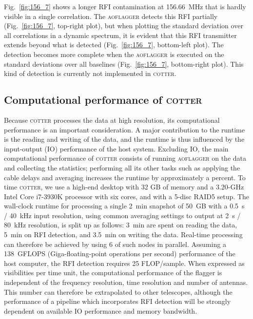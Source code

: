 \documentclass{pasa}
\begin{document}
Fig.~\ref{fig:156_7} shows a longer RFI contamination at 156.66~MHz that is hardly visible in a single correlation. The \textsc{aoflagger} detects this RFI partially (Fig.~\ref{fig:156_7}, top-right plot), but when plotting the standard deviation over all correlations in a dynamic spectrum, it is evident that this RFI transmitter extends beyond what is detected (Fig.~\ref{fig:156_7}, bottom-left plot). The detection becomes more complete when the \textsc{aoflagger} is executed on the standard deviations over all baselines (Fig.~\ref{fig:156_7}, bottom-right plot). This kind of detection is currently not implemented in \textsc{cotter}.

\subsection{Computational performance of \textsc{cotter}}
Because \textsc{cotter} processes the data at high resolution, its computational performance is an important consideration. A major contribution to the runtime is the reading and writing of the data, and the runtime is thus influenced by the input-output (IO) performance of the host system. Excluding IO, the main computational performance of \textsc{cotter} consists of running \textsc{aoflagger} on the data and collecting the statistics; performing all its other tasks such as applying the cable delays and averaging increases the runtime by approximately a percent. To time \textsc{cotter}, we use a high-end desktop with 32 GB of memory and a 3.20-GHz Intel Core i7-3930K processor with six cores, and with a 5-disc RAID5 setup. The wall-clock runtime for processing a single 2~min snapshot of 50~GB with a 0.5~s / 40~kHz input resolution, using common averaging settings to output at 2~s / 80~kHz resolution, is split up as follows: 3~min are spent on reading the data, 5~min on RFI detection, and 3.5~min on writing the data. Real-time processing can therefore be achieved by using 6 of such nodes in parallel. Assuming a 138~GFLOPS (Giga-floating-point operations per second) performance of the host computer, the RFI detection requires 25 FLOP/sample. When expressed as visibilities per time unit, the computational performance of the flagger is independent of the frequency resolution, time resolution and number of antennas. This number can therefore be extrapolated to other telescopes, although the performance of a pipeline which incorporates RFI detection will be strongly dependent on available IO performance and memory bandwidth.
\end{document}
